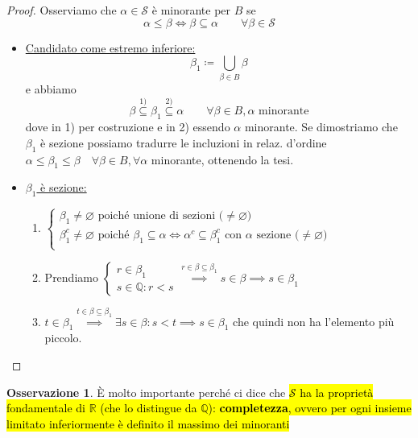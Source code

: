 \documentclass[a4paper,10pt]{article}
\theoremstyle{definition}
\newcommand{\qu}{\mathbb{Q}} %
\newcommand{\re}{\mathbb{R}} %
\theoremstyle{indentdefinition}
\theoremstyle{indentpostulate}
\theoremstyle{indenttheorem}
\theoremstyle{myremark}
\newtheorem*{rem*}{Osservazione}
\theoremstyle{indentgeneral}
\begin{document}
\begin{proof}
    Osserviamo che $\alpha\in\mathscr{S}$ è minorante per $B$ se
    $$\alpha\le \beta\iff\beta\subseteq\alpha\qquad\forall\beta\in\mathscr{S}$$
    \begin{itemize}
        \item \underline{Candidato come estremo inferiore:}
        $$\beta_1\coloneqq\bigcup_{\beta\in B}\beta$$
        e abbiamo
        $$\beta\overset{1)}{\subseteq}\beta_1\overset{2)}{\subseteq}\alpha\qquad\forall\beta\in B,\alpha\text{ minorante}$$
        dove in 1) per costruzione e in 2) essendo $\alpha$ minorante. Se dimostriamo che $\beta_1$ è sezione possiamo tradurre le incluzioni in relaz. d'ordine $\alpha\le\beta_1\le\beta\quad \forall\beta\in B,\forall\alpha$ minorante, ottenendo la tesi.
        \item \underline{$\beta_1$ è sezione:}
        \begin{enumerate}
            \item $\begin{cases}
                \beta_1\ne\varnothing\text{ poiché unione di sezioni ($\ne\varnothing$)}\\
                \beta_1^c\ne\varnothing\text{ poiché $\beta_1\subseteq\alpha\iff\alpha^c\subseteq\beta_1^c$ con $\alpha$ sezione ($\ne\varnothing$)}\\
            \end{cases}$
            \item Prendiamo $\begin{cases}
                r\in\beta_1\\
                s\in\qu:r<s
            \end{cases}\overset{r\in\beta\subseteq\beta_1}{\implies}s\in\beta\implies s\in\beta_1$
            \item $t\in\beta_1{\overset{t\in\beta\subseteq\beta_1}{\implies}}\exists s\in\beta : s<t\implies s\in\beta_1$ che quindi non ha l'elemento più piccolo.
        \end{enumerate}
    \end{itemize}
\end{proof}

\begin{rem*}
    È molto importante perché ci dice che \hl{$\mathscr{S}$ ha la proprietà fondamentale di $\re$ (che lo distingue da $\qu$): \textbf{completezza}, ovvero per ogni insieme limitato inferiormente è definito il massimo dei minoranti}
\end{rem*}
\end{document}
